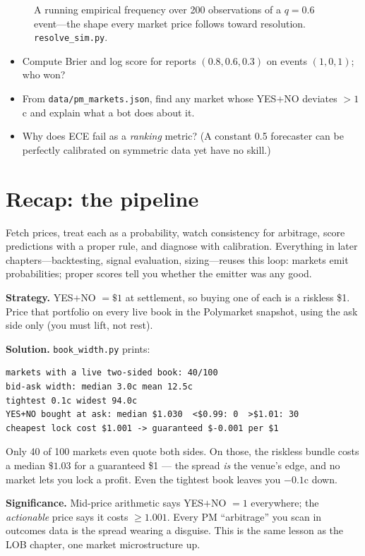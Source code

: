 \begin{figure}[htbp]\centering

\caption{A running empirical frequency over 200 observations of a $q=0.6$ event---the shape
every market price follows toward resolution. \texttt{resolve\_sim.py}.}
\label{fig:path}
\end{figure}

\begin{checkpoint}
\begin{itemize}
\item Compute Brier and log score for reports $(0.8,0.6,0.3)$ on events $(1,0,1)$; who won?
\item From \texttt{data/pm\_markets.json}, find any market whose YES$+$NO deviates $>1$c and
explain what a bot does about it.
\item Why does ECE fail as a \emph{ranking} metric? (A constant 0.5 forecaster can be perfectly
calibrated on symmetric data yet have no skill.)
\end{itemize}
\end{checkpoint}

\section{Recap: the pipeline}\label{sec:pmrecap}

Fetch prices, treat each as a probability, watch consistency for arbitrage, score predictions
with a proper rule, and diagnose with calibration. Everything in later chapters---backtesting,
signal evaluation, sizing---reuses this loop: markets emit probabilities; proper scores tell
you whether the emitter was any good.

\begin{example}\label{ex:lock}
\textbf{Strategy.} YES$+$NO $=\$1$ at settlement, so buying one of
each is a riskless \$1. Price that portfolio on every live book in
the Polymarket snapshot, using the ask side only (you must lift,
not rest).

\textbf{Solution.} \texttt{book\_width.py} prints:
\begin{verbatim}
markets with a live two-sided book: 40/100
bid-ask width: median 3.0c mean 12.5c
tightest 0.1c widest 94.0c
YES+NO bought at ask: median $1.030  <$0.99: 0  >$1.01: 30
cheapest lock cost $1.001 -> guaranteed $-0.001 per $1
\end{verbatim}
Only 40 of 100 markets even quote both sides. On those, the
riskless bundle costs a median $\$1.03$ for a guaranteed \$1 ---
the spread \emph{is} the venue's edge, and no market lets you lock
a profit. Even the tightest book leaves you $-0.1$c down.

\textbf{Significance.} Mid-price arithmetic says YES$+$NO $=1$
everywhere; the \emph{actionable} price says it costs $\ge1.001$.
Every PM ``arbitrage'' you scan in outcomes data is the spread
wearing a disguise. This is the same lesson as the LOB chapter,
one market microstructure up.
\end{example}

